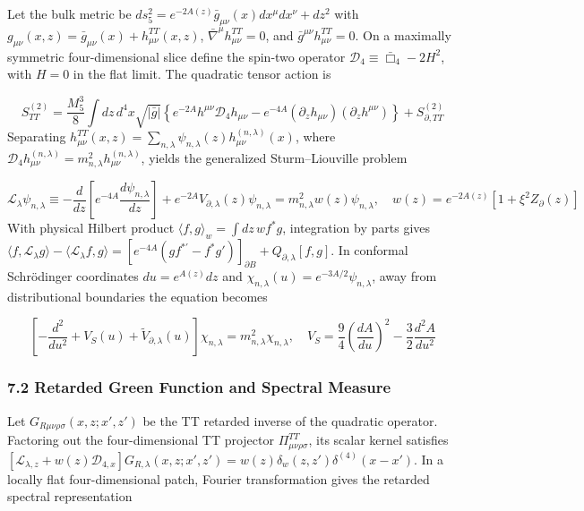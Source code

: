 \documentclass[aps,prd,onecolumn,superscriptaddress,nofootinbib,longbibliography,10pt]{revtex4-2}
\begin{document}
{{Let the bulk metric be \(ds_5^2 = e^{-2A(z)}\bar{g}_{\mu\nu}(x)dx^\mu dx^\nu + dz^2\) with \(g_{\mu\nu}(x,z) = \bar{g}_{\mu\nu}(x) + h_{\mu\nu}^{TT}(x,z)\), \(\bar{\nabla}^\mu h_{\mu\nu}^{TT} = 0\), and \(\bar{g}^{\mu\nu}h_{\mu\nu}^{TT} = 0\). On a maximally symmetric four-dimensional slice define the spin-two operator \(\mathcal{D}_4 \equiv \bar{\Box}_4 - 2H^2\), with \(H = 0\) in the flat limit. The quadratic tensor action is


\[S_{TT}^{(2)} = \frac{M_5^3}{8}\int dz\,d^4x \sqrt{|\bar{g}|} \left\{ e^{-2A}h^{\mu\nu}\mathcal{D}_4 h_{\mu\nu} - e^{-4A}(\partial_z h_{\mu\nu})(\partial_z h^{\mu\nu}) \right\} + S_{\partial,TT}^{(2)}\]
Separating \(h_{\mu\nu}^{TT}(x,z) = \sum_{n,\lambda}\psi_{n,\lambda}(z)h_{\mu\nu}^{(n,\lambda)}(x)\), where \(\mathcal{D}_4 h_{\mu\nu}^{(n,\lambda)} = m_{n,\lambda}^2 h_{\mu\nu}^{(n,\lambda)}\), yields the generalized Sturm--Liouville problem


\[\mathcal{L}_\lambda \psi_{n,\lambda} \equiv -\frac{d}{dz}\left[ e^{-4A}\frac{d\psi_{n,\lambda}}{dz} \right] + e^{-2A}V_{\partial,\lambda}(z)\psi_{n,\lambda} = m_{n,\lambda}^2 w(z)\psi_{n,\lambda}, \quad w(z) = e^{-2A(z)}[1 + \xi^2 Z_\partial(z)]\]
With physical Hilbert product \(\langle f, g\rangle_w = \int dz\, w f^* g\), integration by parts gives \(\langle f, \mathcal{L}_\lambda g\rangle - \langle \mathcal{L}_\lambda f, g\rangle = \left[ e^{-4A}(g f^{*\prime} - f^* g') \right]_{\partial B} + Q_{\partial,\lambda}[f, g]\). In conformal Schr\"odinger coordinates \(du = e^{A(z)}dz\) and \(\chi_{n,\lambda}(u) = e^{-3A/2}\psi_{n,\lambda}\), away from distributional boundaries the equation becomes


\[\left[ -\frac{d^2}{du^2} + V_S(u) + \tilde{V}_{\partial,\lambda}(u) \right]\chi_{n,\lambda} = m_{n,\lambda}^2 \chi_{n,\lambda}, \quad V_S = \frac{9}{4}\left(\frac{dA}{du}\right)^2 - \frac{3}{2}\frac{d^2 A}{du^2}\]


\subsubsection*{7.2 Retarded Green Function and Spectral Measure}

Let \(G_{R\mu\nu\rho\sigma}(x,z; x',z')\) be the TT retarded inverse of the quadratic operator. Factoring out the four-dimensional TT projector \(\Pi_{\mu\nu\rho\sigma}^{TT}\), its scalar kernel satisfies \([\mathcal{L}_{\lambda,z} + w(z)\mathcal{D}_{4,x}]G_{R,\lambda}(x,z; x',z') = w(z)\delta_w(z,z')\delta^{(4)}(x - x')\). In a locally flat four-dimensional patch, Fourier transformation gives the retarded spectral representation


}}
\end{document}
